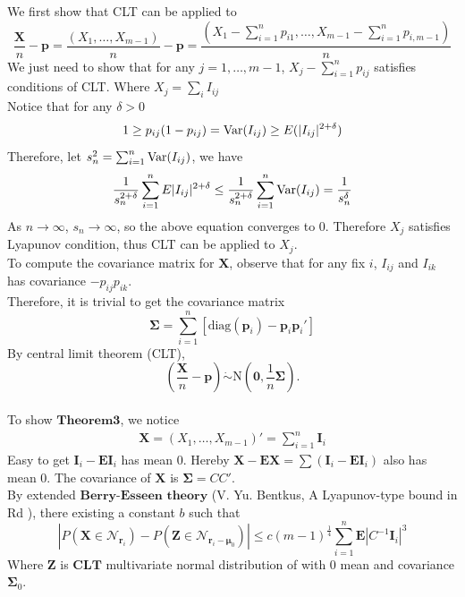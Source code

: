 \documentclass[12pt]{article}
\newcommand{\zerovec}{{\boldsymbol{0}}}
\newcommand{\EE}{\mathbf{E}}
\newcommand{\Var}{{\rm Var}}
\newcommand{\N}{\textrm{N}}
\newcommand{\diag}{\textrm{diag}}
\newcommand{\pvec}{\boldsymbol{p}}
\begin{document}
We first show that CLT can be applied to
\begin{equation*}
\frac{\boldsymbol{X}}{n} - \pvec = \frac{(X_1,\dots,X_{m-1})}{n} - \pvec = \frac{(X_1 - \sum_{i=1}^{n}p_{i1},\dots,X_{m-1} - \sum_{i=1}^{n}p_{i,m-1})}{n}
\end{equation*}
We just need to show that for any $j = 1,\dots,m-1$, $X_j - \sum_{i=1}^{n}p_{ij}$ satisfies conditions of CLT. Where $X_{j} = \sum_i I_{ij}$ \\
Notice that for any $\delta > 0$
\begin{equation*}
    1\geq p_{ij}(1-p_{ij}) = \Var (I_{ij}) \geq E(|I_{ij}|^{2+ \delta})
\end{equation*}
Therefore, let $s_n^2 = \sum_{i=1}^{n}\Var(I_{ij})$, we have
\begin{equation*}
    \frac{1}{s_n^{2+\delta}}\sum_{i=1}^{n}E|I_{ij}|^{2 + \delta} \leq  \frac{1}{s_n^{2+\delta}}\sum_{i=1}^{n}\Var(I_{ij}) = \frac{1}{s_n^\delta}
\end{equation*}
As $n \rightarrow \infty$, $s_n \rightarrow \infty$, so the above equation converges to 0. Therefore $X_j$ satisfies Lyapunov condition, thus CLT can be applied to $X_j$. \\
To compute the covariance matrix for $\boldsymbol{X}$,
observe that for any fix $i$, $I_{ij}$ and $I_{ik}$ has covariance $-p_{ij}p_{ik}$. \\


Therefore, it is trivial to get the covariance matrix $$\boldsymbol{\Sigma}=\sum_{i=1}^n[\diag(\pvec_i)-\pvec_i\pvec_i']$$
By central limit theorem (CLT),
$$\left(\frac{\boldsymbol{X}}{n}-\pvec\right)\dot\sim \N\left(\zerovec, \frac{1}{n}\boldsymbol{\Sigma}\right).$$\\

To show $\mathbf{Theorem 3}$, we notice
\begin{align*}
    \boldsymbol{X} = (X_1,\dots,X_{m-1})' = \sum_{i=1}^{n} \boldsymbol{I}_{i} 
\end{align*}
Easy to get $\boldsymbol{I}_i - \EE \boldsymbol{I}_i$ has mean 0. Hereby $\boldsymbol{X} - \EE \boldsymbol{X} = \sum (\boldsymbol{I}_i - \EE \boldsymbol{I}_i)$ also has mean 0. The covariance of $\boldsymbol{X}$ is $\boldsymbol{\Sigma} = CC'$.\\ 
By extended $\textbf{Berry-Esseen theory}$ (V. Yu. Bentkus, A Lyapunov-type bound in Rd
), there existing  a constant $b$ such that 
\begin{equation*}
    |P\left(\boldsymbol{X} \in \mathcal{N}_{\boldsymbol{r}_i}\right) - P\left(\boldsymbol{Z} \in \mathcal{N}_{\boldsymbol{r}_i-\boldsymbol{\mu}_0} \right)| \leq c(m-1)^{\frac{1}{4}}\sum_{i=1}^{n} \EE \left|C^{-1}\boldsymbol{I}_i\right|^3
\end{equation*}
Where $\boldsymbol{Z}$ is $\textbf{CLT}$ multivariate normal distribution of with 0 mean and covariance $\boldsymbol{\Sigma}_0$. 
\end{document}
